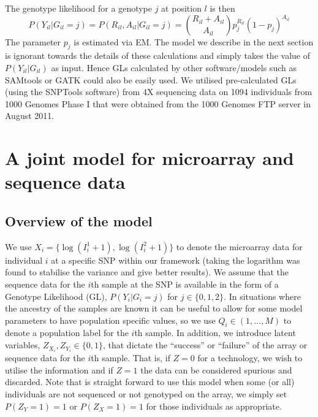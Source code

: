 The genotype likelihood for a genotype $j$ at position $l$ is then
$$P(Y_{il}|G_{il}=j) = P(R_{il},A_{il}|G_{il}=j) = \binom{R_{il}+A_{il} }{A_{il}} p_j^{R_{il}} (1-p_j)^{A_{il}} $$
The parameter $p_j$ is estimated via EM.  The model we describe in the next section is ignorant towards the details of these calculations and simply takes the value of $P(Y_{il}|G_{il})$ as input.  Hence GLs calculated by other software/models such as SAMtools \citep{li2011improving} or GATK \citep{McKenna2010} could also be easily used.  We utilised pre-calculated GLs (using the SNPTools software) from 4X sequencing data on 1094 individuals from  1000 Genomes Phase I that were obtained from the 1000 Genomes FTP server in August 2011.



\section{A joint model for microarray and sequence data}
\label{chap2:chiamante}
\subsection{Overview of the model}
 We use $X_i  = \{\log(I_i^1+1), \log(I_i^2+1)\}$ to denote the microarray data for individual $i$ at a specific SNP within our framework (taking the logarithm was found to stabilise the variance and give better results). We assume that the sequence data for the $i$th sample at the SNP is available in the form of a Genotype Likelihood (GL), $P(Y_i|G_i=j)$ for $j\in\{0,1,2\}$. In situations where the ancestry of the samples are known it can be useful to allow for some model parameters to have population specific values, so we use $Q_i \in (1,\ldots,M)$ to denote a population label for the $i$th sample. In addition, we introduce latent variables, $Z_{X_i},Z_{Y_i} \in \{0,1\} $, that dictate the ``success'' or ``failure'' of the array or sequence data for the $i$th sample. That is, if $Z=0$ for a technology, we wish to utilise the information and if $Z=1$ the data can be considered spurious and discarded. Note that is straight forward to use this model when some (or all) individuals are not sequenced or not genotyped on the array, we simply set $P(Z_Y=1)=1$ or $P(Z_X=1)=1$ for those individuals as appropriate.

